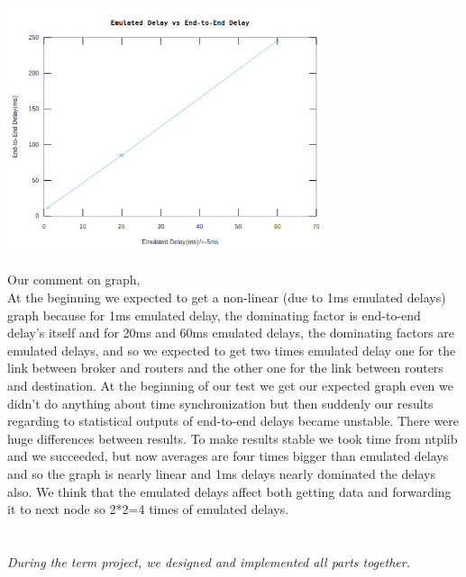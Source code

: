 \documentclass[conference]{IEEEtran}
\begin{document}
\includegraphics[width=9.5cm,scale=0.25]{graph.jpeg}\\[0.1cm]
\\
Our comment on graph, \\
At the beginning we expected to get a non-linear (due to 1ms emulated delays) graph because for 1ms emulated delay, the dominating factor is end-to-end delay's itself and for 20ms and 60ms emulated delays, the dominating factors are emulated delays, and so we expected to get two times emulated delay one for the link between broker and routers and the other one for the link between routers and destination. At the beginning of our test we get our expected graph even we didn't do anything about time synchronization but then suddenly our results regarding to statistical outputs of end-to-end delays became unstable. There were huge differences between results. To make results stable we took time from ntplib and we succeeded, but now averages are four times bigger than emulated delays and so the graph is nearly linear and 1ms delays nearly dominated the delays also. We think that the emulated delays affect both getting data and forwarding it to next node so 2*2=4 times of emulated delays.
\\
\\
\\
\textit{During the term project, we designed and implemented all parts together. }
\end{document}
